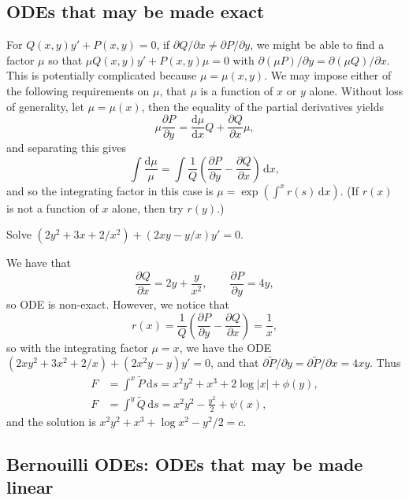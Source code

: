 \documentclass[letter-paper]{tufte-book}
\newenvironment{example}[1][Example]{\begin{trivlist}
\item[\hskip \labelsep {\bfseries #1}]}{\end{trivlist}}
\newcommand{\dy}{\partial}
\newcommand{\ddy}[2]{\frac{\dy#1}{\dy#2}}
\begin{document}
\subsection{ODEs that may be made exact}

For $Q(x,y)y'+P(x,y)=0$, if $\dy Q/\dy x\neq \dy P/\dy y$, we might be able to
find a factor $\mu$ so that $\mu Q(x,y)y'+P(x,y)\mu=0$ with $\dy(\mu P)/\dy
y=\dy(\mu Q)/\dy x$. This is potentially complicated because $\mu=\mu(x,y)$. We
may impose either of the following requirements on $\mu$, that $\mu$ is a
function of $x$ or $y$ alone. Without loss of generality, let $\mu=\mu(x)$, then
the equality of the partial derivatives yields
\begin{equation*}
  \mu\ddy{P}{y}=\frac{\mathrm{d}\mu}{\mathrm{d}x}Q+\ddy{Q}{x}\mu,
\end{equation*}
and separating this gives
\begin{equation*}
  \int\frac{\mathrm{d}\mu}{\mu}=
  \int\frac{1}{Q}\left(\ddy{P}{y}-\ddy{Q}{x}\right)\, \mathrm{d}x,
\end{equation*}
and so the integrating factor in this case is $\mu=\exp(\int^x r(s)\,
\mathrm{d}x)$. (If $r(x)$ is not a function of $x$ alone, then try $r(y)$.)
\begin{example}
  Solve $(2y^2+3x+2/x^2)+(2xy-y/x)y'=0$.
  
  We have that
  \begin{equation*}
    \ddy{Q}{x}=2y+\frac{y}{x^2},\qquad \ddy{P}{y}=4y,
  \end{equation*}
  so ODE is non-exact. However, we notice that
  \begin{equation*}
    r(x)=\frac{1}{Q}\left(\ddy{P}{y}-\ddy{Q}{x}\right)=\frac{1}{x},
  \end{equation*}
  so with the integrating factor $\mu=x$, we have the ODE
  $(2xy^2+3x^2+2/x)+(2x^2 y-y)y'=0$, and that $\dy\tilde{P}/\dy
  y=\dy\tilde{P}/\dy x=4xy$. Thus
  \begin{align*}
    F &= \int^x \tilde{P}\, \mathrm{d}s = x^2 y^2 + x^3 + 2\log|x| + \phi(y), \\
    F &= \int^y \tilde{Q}\, \mathrm{d}s = x^2 y^2 - \frac{y^2}{2} + \psi(x),
  \end{align*}
  and the solution is $x^2 y^2 + x^3 + \log x^2 - y^2 / 2 = c$.
\end{example}

\subsection{Bernouilli ODEs: ODEs that may be made linear}
\end{document}
